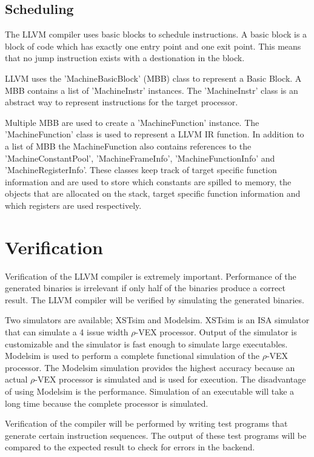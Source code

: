 \subsection{Scheduling} %
\label{sub:scheduling}
The LLVM compiler uses basic blocks to schedule instructions. A basic block is a block of code which has exactly one entry point and one exit point. This means that no jump instruction exists with a destionation in the block. 

LLVM uses the 'MachineBasicBlock' (MBB) class to represent a Basic Block. A MBB contains a list of 'MachineInstr' instances. The 'MachineInstr' class is an abstract way to represent instructions for the target processor.

Multiple MBB are used to create a 'MachineFunction' instance. The 'MachineFunction' class is used to represent a LLVM IR function. In addition to a list of MBB the MachineFunction also contains references to the 'MachineConstantPool', 'MachineFrameInfo', 'MachineFunctionInfo' and 'MachineRegisterInfo'. These classes keep track of target specific function information and are used to store which constants are spilled to memory, the objects that are allocated on the stack, target specific function information and which registers are used respectively. 



\section{Verification}
Verification of the LLVM compiler is extremely important. Performance of the generated binaries is irrelevant if only half of the binaries produce a correct result. The LLVM compiler will be verified by simulating the generated binaries. 

Two simulators are available; XSTsim and Modelsim. XSTsim is an ISA simulator that can simulate a 4 issue width $\rho$-VEX processor. Output of the simulator is customizable and the simulator is fast enough to simulate large executables. Modelsim is used to perform a complete functional simulation of the $\rho$-VEX processor. The Modelsim simulation provides the highest accuracy because an actual $\rho$-VEX processor is simulated and is used for execution. The disadvantage of using Modelsim is the performance. Simulation of an executable will take a long time because the complete processor is simulated.

Verification of the compiler will be performed by writing test programs that generate certain instruction sequences. The output of these test programs will be compared to the expected result to check for errors in the backend.

